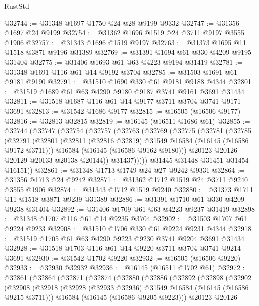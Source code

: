 \begin{lexlean}{RustStd}
\begin{coremodule}
@32744 := @31348 @1697 @1750 @24 @28 @9199 @9332
@32747 := @31356 @1697 @24 @9199
@32754 := @31362 @1696 @1519 @24 @3711 @9197 @3555 @1906
@32757 := @31343 @1696 @1519 @9197
@32763 := @31373 @1695 @11 @1518 @3871 @9196 @31389
@32769 := @31391 @1694 @61 @330 @4209 @9195 @31404
@32775 := @31406 @1693 @61 @63 @4223 @9194 @31419
@32781 := @31348 @1691 @116 @61 @14 @9192 @3704
@32785 := @31503 @1691 @61 @9181 @9190
@32791 := @31510 @1690 @330 @61 @9181 @9188 @4344
@32801 := @31519 @1689 @61 @63 @4290 @9180 @9187 @3741 @9161 @3691 @31434
@32811 := @31518 @1687 @116 @61 @14 @9177 @3711 @3704 @3741 @9171 @3691
@32813 := @31542 @1686 @9177
@32815 := @16505 (@16506 @9177)
@32816 := @32813 @32815
@32819 := @16145 (@16511 @1686 @61)
@32855 := @32744
    (@32747
      (@32754
        (@32757
          (@32763
            (@32769
              (@32775
                (@32781
                  (@32785
                    (@32791
                      (@32801
                        (@32811 (@32816 @32819) @31549 @16584 (@16145 (@16586 @9172 @3711)))
                        @16584
                        (@16145 (@16586 @9162 @9180)))
                      @20123
                      @20126
                      @20129
                      @20133
                      @20138
                      @20144))
                  @31437)))))
        @31445
        @31448
        @31451
        @31454
        @16151))
@32861 := @31348 @1713 @1749 @24 @27 @9242 @9331
@32864 := @31356 @1713 @24 @9242
@32871 := @31362 @1712 @1519 @24 @3711 @9240 @3555 @1906
@32874 := @31343 @1712 @1519 @9240
@32880 := @31373 @1711 @11 @1518 @3871 @9239 @31389
@32886 := @31391 @1710 @61 @330 @4209 @9238 @31404
@32892 := @31406 @1709 @61 @63 @4223 @9237 @31419
@32898 := @31348 @1707 @116 @61 @14 @9235 @3704
@32902 := @31503 @1707 @61 @9224 @9233
@32908 := @31510 @1706 @330 @61 @9224 @9231 @4344
@32918 := @31519 @1705 @61 @63 @4290 @9223 @9230 @3741 @9204 @3691 @31434
@32928 := @31518 @1703 @116 @61 @14 @9220 @3711 @3704 @3741 @9214 @3691
@32930 := @31542 @1702 @9220
@32932 := @16505 (@16506 @9220)
@32933 := @32930 @32932
@32936 := @16145 (@16511 @1702 @61)
@32972 := @32861
    (@32864
      (@32871
        (@32874
          (@32880
            (@32886
              (@32892
                (@32898
                  (@32902
                    (@32908
                      (@32918
                        (@32928 (@32933 @32936) @31549 @16584 (@16145 (@16586 @9215 @3711)))
                        @16584
                        (@16145 (@16586 @9205 @9223)))
                      @20123
                      @20126

\end{coremodule}
\end{lexlean}
